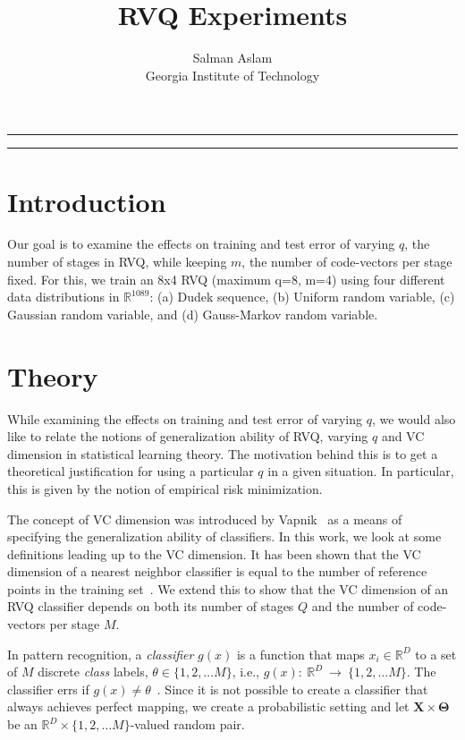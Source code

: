 
\title{RVQ Experiments}
\author{Salman Aslam\\ Georgia Institute of Technology}
\date{}


\maketitle
\rule[0pt]{\textwidth}{1pt}
\tableofcontents
\rule[0pt]{\textwidth}{1pt}

\section{Introduction}
Our goal is to examine the effects on training and test error of varying $q$, the number of stages in RVQ, while keeping $m$, the number of code-vectors per stage fixed.  For this, we train an 8x4 RVQ (maximum q=8, m=4) using four different data distributions in $\mathbb{R}^{1089}$: (a) Dudek sequence, (b) Uniform random variable, (c) Gaussian random variable, and (d) Gauss-Markov random variable.

\section{Theory}
While examining the effects on training and test error of varying $q$, we would also like to relate the notions of generalization ability of RVQ, varying $q$ and VC dimension in statistical learning theory.  The  motivation behind this is to get a theoretical justification for using a particular $q$ in a given situation.  In particular, this is given by the notion of empirical risk minimization.

The concept of VC dimension was introduced by Vapnik~\cite{1999_BOOK_PRML_Vapnik} as a means of specifying the generalization ability of classifiers.  In this work, we look at some definitions leading up to the VC dimension.  It has been shown that the VC dimension of a nearest neighbor classifier is equal to the number of reference points in the training set~\cite{2003_JNL_PRML_Karacali}.  We extend this to show that the VC dimension of an RVQ classifier depends on both its number of stages $Q$ and the number of code-vectors per stage $M$.


In pattern recognition, a \emph{classifier} $g(x)$ is a function that maps $x_i \in \mathbb{R}^D$ to a set of $M$ discrete \emph{class} labels, $\theta  \in \{1, 2, \ldots M\}$, i.e., $g(x):~\mathbb{R}^D~\rightarrow~\{1, 2, \ldots M\}$.  The classifier errs if $g(x) \neq \theta$~\cite{1996_BOOK_PR_DevroyeGyorfiLugosi}.  Since it is not possible to create a classifier that always achieves perfect mapping, we create a probabilistic setting and let $\mathbf{X} \times \mathbf{\Theta}$ be an $\mathbb{R}^D \times \{1, 2, \ldots M\}$-valued random pair.  

